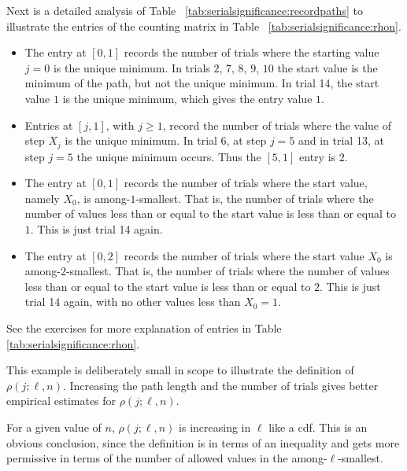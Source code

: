 \documentclass[12pt]{article}
\begin{document}
\begin{example}
    Next is a detailed analysis of Table~%
    \ref{tab:serialsignificance:recordpaths} to illustrate the entries
    of the counting matrix in Table~%
    \ref{tab:serialsignificance:rhon}.
    \begin{itemize}
        \item
            The entry at \( [0,1] \) records the number of trials where
            the starting value \( j=0 \) is the unique minimum.  In
            trials \( 2 \), \( 7 \), \( 8 \), \( 9 \), \( 10 \) the
            start value is the minimum of the path, but not the unique
            minimum. In trial 14, the start value \( 1 \) is the unique
            minimum, which gives the entry value \( 1 \).
        \item
            Entries at \( [j,1] \), with \( j \ge 1 \), record the
            number of trials where the value of step \( X_j \) is the
            unique minimum.  In trial 6, at step \( j=5 \) and in trial
            13, at step \( j = 5 \) the unique minimum occurs. Thus the \(
            [5,1] \) entry is \( 2 \).
        \item
            The entry at \( [0,1] \) records the number of trials where
            the start value, namely \( X_0 \), is among-\( 1 \)-smallest.
            That is, the number of trials where the number of values
            less than or equal to the start value is less than or equal
            to \( 1 \).  This is just trial 14 again.
        \item
            The entry at \( [0,2] \) records the number of trials where
            the start value \( X_0 \) is among-\( 2 \)-smallest.  That
            is, the number of trials where the number of values less
            than or equal to the start value is less than or equal to \(
            2 \).  This is just trial 14 again, with no other values
            less than \( X_0 = 1 \).
    \end{itemize}
    See the exercises for more explanation of entries in Table~%
    \ref{tab:serialsignificance:rhon}.

    This example is deliberately small in scope to illustrate the
    definition of \( \rho(j; \ell, n) \).  Increasing the path length
    and the number of trials gives better empirical estimates for \(
    \rho(j; \ell, n) \).
\end{example}

\begin{remark}
    For a given value of \( n \), \( \rho(j; \ell, n) \) is increasing
    in \( \ell \) like a cdf.  This is an obvious conclusion, since the
    definition is in terms of an inequality and gets more permissive in
    terms of the number of allowed values in the among-\( \ell \)-smallest.
\end{remark}
\end{document}
